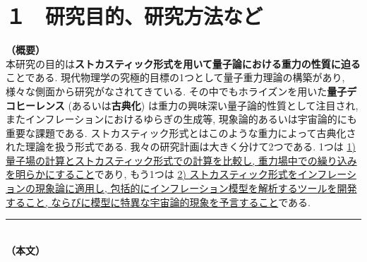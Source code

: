\documentclass[11pt,a4j,dvipdfmx]{jarticle} 					%
\newcommand{\研究課題名}{\mgfamily\sffamily ストカスティック形式でせまる重力と量子論}
\newcommand{\研究機関名}{\mgfamily\sffamily 名古屋大学}
\newcommand{\研究代表者氏名}{\mgfamily\sffamily 多田祐一郎}
\newcommand{\研究期間の最終元号年度}{34}  %
\renewcommand{\emph}[1]{{\sffamily\gtfamily\bfseries #1}}
\begin{document}

\section{１　研究目的、研究方法など}

\noindent
\textbf{（概要）}\\
	\mgfamily\sffamily
	本研究の目的は\emph{ストカスティック形式を用いて量子論における重力の性質に迫る}ことである. 
	現代物理学の究極的目標の1つとして量子重力理論の構築があり, 様々な側面から研究がなされてきている.
	その中でもホライズンを用いた\emph{量子デコヒーレンス} (あるいは\emph{古典化}) は重力の興味深い量子論的性質として注目され,
	またインフレーションにおけるゆらぎの生成等, 現象論的あるいは宇宙論的にも重要な課題である.
	ストカスティック形式とはこのような重力によって古典化された理論を扱う形式である.
	我々の研究計画は大きく分けて2つである. 1つは \ul{1) 量子場の計算とストカスティック形式での計算を比較し,
	重力場中での繰り込みを明らかにすること}であり, もう1つは \ul{2) ストカスティック形式をインフレーションの現象論に適用し,
	包括的にインフレーション模型を解析するツールを開発すること, ならびに模型に特異な宇宙論的現象を予言すること}である.
	\vspace*{10zw}	%

\noindent
\rule{\linewidth}{1pt}\\
\noindent
\textbf{（本文）}

\begin{comment}
\textbf{\\　　　　　＊＊＊　以下は、あくまで例です。真似しないでください。　＊＊＊\\
　　　　　＊＊＊　本文はもちろん、節の切り方や論理の組み方は　　　＊＊＊\\
　　　　　＊＊＊　ご自分の気に入ったスタイルで書いてください。　　＊＊＊}

	 象の卵の研究目的は．．．

	象の卵の研究計画は．．．

	\vspace{1cm}
	\begin{thebibliography}{99}
		\bibitem{teramura} 寺村輝夫、「ぼくは王様 - ぞうのたまごのたまごやき」.
	\end{thebibliography}
\end{comment}
\end{document}
